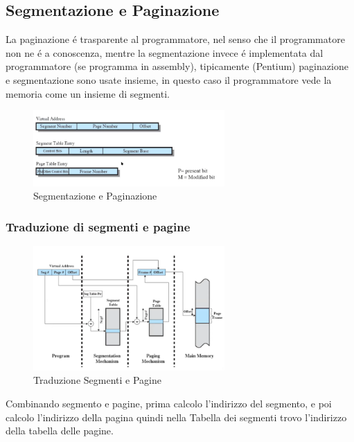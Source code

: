     \subsection{Segmentazione e Paginazione}
    La paginazione é trasparente al programmatore, nel senso che il programmatore non ne é a conoscenza, mentre la
    segmentazione invece é implementata dal programmatore (se programma in assembly), tipicamente (Pentium) paginazione
    e segmentazione sono usate insieme, in questo caso il programmatore vede la memoria come un insieme di segmenti.
    \begin{figure}[H]
        \centering
        \includegraphics[width=0.65\textwidth]{immagini/Combinazione Segmenti e pagine}
        \caption{Segmentazione e Paginazione}
    \end{figure}
    \subsubsection*{Traduzione di segmenti e pagine}
    \begin{figure}[H]
        \centering
        \includegraphics[width=0.65\textwidth]{immagini/Traduzione Segmenti e Pagine}
        \caption{Traduzione Segmenti e Pagine}
    \end{figure}
    Combinando segmento e pagine, prima calcolo l'indirizzo del segmento, e poi calcolo l'indirizzo della pagina
    quindi nella Tabella dei segmenti trovo l'indirizzo della tabella delle pagine.
